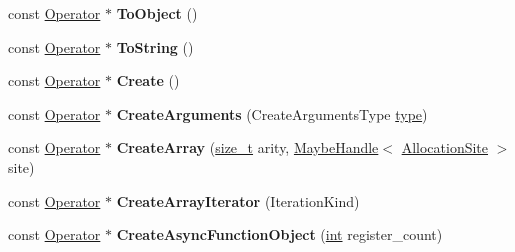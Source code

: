 \begin{DoxyCompactItemize}
const \mbox{\hyperlink{classv8_1_1internal_1_1compiler_1_1Operator}{Operator}} $\ast$ {\bfseries To\+Object} ()
\item 
\mbox{\label{classv8_1_1internal_1_1compiler_1_1JSOperatorBuilder_a30e95ac6e7c6d4e0c8234d6312e8e7e0}} 
const \mbox{\hyperlink{classv8_1_1internal_1_1compiler_1_1Operator}{Operator}} $\ast$ {\bfseries To\+String} ()
\item 
\mbox{\label{classv8_1_1internal_1_1compiler_1_1JSOperatorBuilder_aa327ea8f44de69684c13c08463b2aa42}} 
const \mbox{\hyperlink{classv8_1_1internal_1_1compiler_1_1Operator}{Operator}} $\ast$ {\bfseries Create} ()
\item 
\mbox{\label{classv8_1_1internal_1_1compiler_1_1JSOperatorBuilder_abfdd3343b4933dbcb4f9ea7c452adea7}} 
const \mbox{\hyperlink{classv8_1_1internal_1_1compiler_1_1Operator}{Operator}} $\ast$ {\bfseries Create\+Arguments} (Create\+Arguments\+Type \mbox{\hyperlink{classstd_1_1conditional_1_1type}{type}})
\item 
\mbox{\label{classv8_1_1internal_1_1compiler_1_1JSOperatorBuilder_a4a53a1b80807af15d7952a2f0599bab6}} 
const \mbox{\hyperlink{classv8_1_1internal_1_1compiler_1_1Operator}{Operator}} $\ast$ {\bfseries Create\+Array} (\mbox{\hyperlink{classsize__t}{size\+\_\+t}} arity, \mbox{\hyperlink{classv8_1_1internal_1_1MaybeHandle}{Maybe\+Handle}}$<$ \mbox{\hyperlink{classv8_1_1internal_1_1AllocationSite}{Allocation\+Site}} $>$ site)
\item 
\mbox{\label{classv8_1_1internal_1_1compiler_1_1JSOperatorBuilder_a8f8dc6dbb575f186ca85ce9ab0ef4688}} 
const \mbox{\hyperlink{classv8_1_1internal_1_1compiler_1_1Operator}{Operator}} $\ast$ {\bfseries Create\+Array\+Iterator} (Iteration\+Kind)
\item 
\mbox{\label{classv8_1_1internal_1_1compiler_1_1JSOperatorBuilder_a7339295d53da749cbcb056ef2735ec20}} 
const \mbox{\hyperlink{classv8_1_1internal_1_1compiler_1_1Operator}{Operator}} $\ast$ {\bfseries Create\+Async\+Function\+Object} (\mbox{\hyperlink{classint}{int}} register\+\_\+count)

\end{DoxyCompactItemize}

